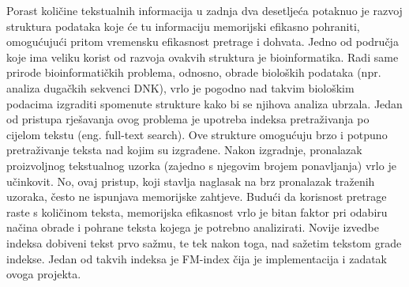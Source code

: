 Porast količine tekstualnih informacija u zadnja dva desetljeća potaknuo je razvoj struktura podataka koje će tu informaciju memorijski efikasno pohraniti, omogućujući pritom vremensku efikasnost pretrage i dohvata. Jedno od područja koje ima veliku korist od razvoja ovakvih struktura je bioinformatika. Radi same prirode bioinformatičkih problema, odnosno, obrade bioloških podataka (npr. analiza dugačkih sekvenci DNK), vrlo je pogodno nad takvim biološkim podacima izgraditi spomenute strukture kako bi se njihova analiza ubrzala.
Jedan od pristupa rješavanja ovog problema je upotreba indeksa pretraživanja po cijelom tekstu (eng. full-text search). Ove strukture omogućuju brzo i potpuno pretraživanje teksta nad kojim su izgrađene. Nakon izgradnje, pronalazak proizvoljnog tekstualnog uzorka (zajedno s njegovim brojem ponavljanja) vrlo je učinkovit. No, ovaj pristup, koji stavlja naglasak na brz pronalazak traženih uzoraka, često ne ispunjava memorijske zahtjeve. Budući da korisnost pretrage raste s količinom teksta, memorijska efikasnost vrlo je bitan faktor pri odabiru načina obrade i pohrane teksta kojega je potrebno analizirati.
Novije izvedbe indeksa dobiveni tekst prvo sažmu, te tek nakon toga, nad sažetim tekstom grade indekse. Jedan od takvih indeksa je FM-index čija je implementacija i zadatak ovoga projekta.
